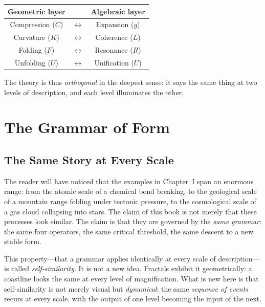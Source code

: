 \documentclass[12pt, oneside]{book}
\theoremstyle{plain}
\theoremstyle{definition}
\theoremstyle{remark}
\begin{document}
\begin{center}
\begin{tabular}{ccc}
\textbf{Geometric layer} & & \textbf{Algebraic layer} \\
\hline
Compression ($C$) & $\longleftrightarrow$ & Expansion ($g$) \\
Curvature ($K$) & $\longleftrightarrow$ & Coherence ($L$) \\
Folding ($F$) & $\longleftrightarrow$ & Resonance ($R$) \\
Unfolding ($U$) & $\longleftrightarrow$ & Unification ($U$) \\
\end{tabular}
\end{center}

The theory is thus \emph{orthogonal} in the deepest sense: it
says the same thing at two levels of description, and each
level illuminates the other.

\chapter{The Grammar of Form}
\label{ch:grammar}

\section{The Same Story at Every Scale}

The reader will have noticed that the examples in Chapter~I
span an enormous range: from the atomic scale of a chemical
bond breaking, to the geological scale of a mountain range
folding under tectonic pressure, to the cosmological scale of
a gas cloud collapsing into stars. The claim of this book is
not merely that these processes look similar. The claim is that
they are governed by the \emph{same grammar}: the same four
operators, the same critical threshold, the same descent to
a new stable form.

This property---that a grammar applies identically at every
scale of description---is called \emph{self-similarity}.
It is not a new idea. Fractals exhibit it geometrically:
a coastline looks the same at every level of magnification.
What is new here is that self-similarity is not merely visual
but \emph{dynamical}: the same \emph{sequence of events}
recurs at every scale, with the output of one level becoming
the input of the next.
\end{document}
